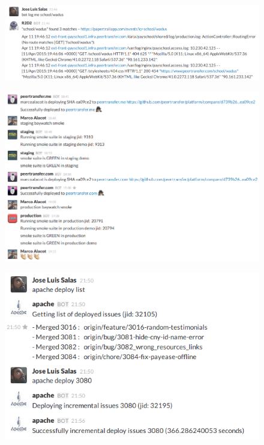\documentclass[
paper=128mm:96mm, %
fontsize=11pt, %
pagesize, %
parskip=half-, %
]{scrartcl} %
\theoremstyle{mythmstyle} %
\begin{document}
\clearpage


\begin{figure}[h]
\centering\includegraphics[width=1.0\linewidth]{papertrail.png}
\end{figure}

\clearpage


\begin{figure}[h]
\centering\includegraphics[width=0.9\linewidth]{deploy.png}
\end{figure}

\clearpage


\begin{figure}[h]
\centering\includegraphics[width=0.8\linewidth]{deploy_mono.png}
\end{figure}
\end{document}
